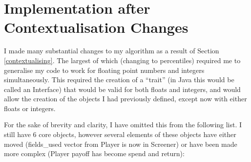 \section{Implementation after Contextualisation Changes} \label{implementationContext}
I made many substantial changes to my algorithm as a result of Section \ref{contextualising}. The largest of which (changing to percentiles) required me to generalise my code to work for floating point numbers and integers simultaneously. This required the creation of a ``trait'' (in Java this would be called an Interface) that would be valid for both floats and integers, and would allow the creation of the objects I had previously defined, except now with either floats or integers. \newline

For the sake of brevity and clarity, I have omitted this from the following list. I still have 6 core objects, however several elements of these objects have either moved (fields\_used vector from Player is now in Screener) or have been made more complex (Player payoff has become spend and return):

